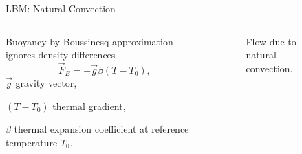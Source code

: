 \documentclass{beamer}
\begin{document}
\begin{frame}{LBM: Natural Convection}
\begin{columns}[T] %
\begin{column}{.5\textwidth}
Buoyancy by Boussinesq approximation ignores density differences
\begin{equation}
\vec{F}_B = -\vec{g}\beta(T-T_0),
\end{equation}
$\vec{g}$ gravity vector,

$(T-T_0)$ thermal gradient,

$\beta$ thermal expansion coefficient at reference temperature $T_0$.

\end{column}%
\hfill%
\begin{column}{0.4\textwidth}
\begin{figure}[t]
	\begin{tiny}
	\def\svgwidth{1.0\linewidth}
	
	\end{tiny}
\caption{Flow due to natural convection.}
\label{fig:natural_convection}
\end{figure}
\end{column}%
\end{columns}
\end{frame}
\end{document}
